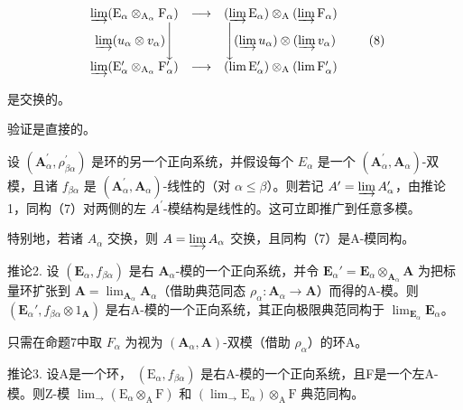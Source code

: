 \[
\begin{array}{c c c} \varinjlim (\mathrm{E} _ {\alpha} \otimes_ {\mathrm{A} _ {\alpha}} \mathrm{F} _ {\alpha}) & \longrightarrow & (\varinjlim \mathrm{E} _ {\alpha}) \otimes_ {\mathrm{A}} (\varinjlim \mathrm{F} _ {\alpha}) \\ \varinjlim (u _ {\alpha} \otimes v _ {\alpha}) \Bigg \downarrow & & \Bigg \downarrow (\varinjlim u _ {\alpha}) \otimes (\varinjlim v _ {\alpha}) \\ \varinjlim (\mathrm{E} _ {\alpha} ^ {\prime} \otimes_ {\mathrm{A} _ {\alpha}} \mathrm{F} _ {\alpha} ^ {\prime}) & \longrightarrow & (\lim \mathrm{E} _ {\alpha} ^ {\prime}) \otimes_ {\mathrm{A}} (\lim \mathrm{F} _ {\alpha} ^ {\prime}) \end{array}\tag{8}
\]

是交换的。

验证是直接的。

设 \((\mathbf{A}_{\alpha}^{\prime}, \rho_{\beta\alpha}^{\prime})\) 是环的另一个正向系统，并假设每个 \(E_{\alpha}\) 是一个 \((\mathbf{A}_{\alpha}^{\prime}, \mathbf{A}_{\alpha})\)-双模，且诸 \(f_{\beta\alpha}\) 是 \((\mathbf{A}_{\alpha}^{\prime}, \mathbf{A}_{\alpha})\)-线性的（对 \(\alpha \leqslant \beta\)）。则若记 \(A^{\prime} = \varinjlim A_{\alpha}^{\prime}\)，由推论1，同构（7）对两侧的左 \(A^{\prime}\)-模结构是线性的。这可立即推广到任意多模。

特别地，若诸 \(A_{\alpha}\) 交换，则 \(A = \varinjlim A_{\alpha}\) 交换，且同构（7）是A-模同构。

推论2. 设 \((\mathbf{E}_{\alpha}, f_{\beta \alpha})\) 是右 \(\mathbf{A}_{\alpha}\)-模的一个正向系统，并令 \(\mathbf{E}_{\alpha}' = \mathbf{E}_{\alpha} \otimes_{\mathbf{A}_{\alpha}} \mathbf{A}\) 为把标量环扩张到 \(\mathbf{A} = \lim_{\mathbf{A}_{\alpha}} \mathbf{A}_{\alpha}\)（借助典范同态 \(\rho_{\alpha}: \mathbf{A}_{\alpha} \to \mathbf{A}\)）而得的A-模。则 \((\mathbf{E}_{\alpha}', f_{\beta \alpha} \otimes 1_{\mathbf{A}})\) 是右A-模的一个正向系统，其正向极限典范同构于 \(\lim_{\mathbf{E}_{\alpha}} \mathbf{E}_{\alpha}\)。

只需在命题7中取 \(F_{\alpha}\) 为视为 \((\mathbf{A}_{\alpha}, \mathbf{A})\)-双模（借助 \(\rho_{\alpha}\)）的环A。

推论3. 设A是一个环， \((\mathrm{E}_{\alpha}, f_{\beta\alpha})\) 是右A-模的一个正向系统，且F是一个左A-模。则Z-模 \(\lim_{\longrightarrow} (\mathrm{E}_{\alpha} \otimes_{\mathrm{A}} \mathrm{F})\) 和 \((\lim_{\longrightarrow} \mathrm{E}_{\alpha}) \otimes_{\mathrm{A}} \mathrm{F}\) 典范同构。

